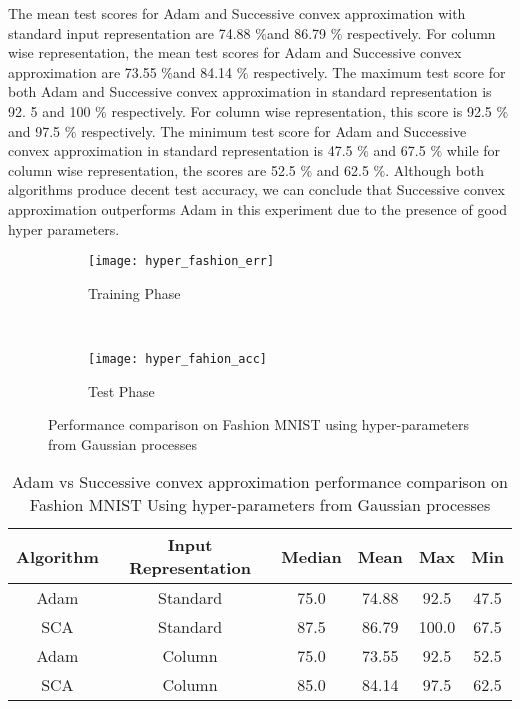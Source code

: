 The mean test scores for Adam and Successive convex approximation with standard input representation are 74.88 $\%$and 86.79 $\%$ respectively. For column wise representation, the mean test scores for Adam and Successive convex approximation are 73.55 $\%$and 84.14 $\%$ respectively. The maximum test score for both Adam and Successive convex approximation in standard representation is 92. 5 and 100 $\%$ respectively. For column wise representation, this score is 92.5 $\%$ and 97.5 $\%$ respectively. The minimum test score for Adam and Successive convex approximation in standard representation is 47.5 $\%$ and 67.5 $\%$ while for column wise representation, the scores are 52.5 $\%$ and 62.5 $\%$. Although both algorithms produce decent test accuracy, we can conclude that Successive convex approximation outperforms Adam in this experiment due to the presence of good hyper parameters.


\begin{figure*}[t!]
    \centering
    \begin{subfigure}[t]{0.5\textwidth}
        \centering
        \texttt{[image: hyper\_fashion\_err]}
        \caption{Training Phase}
    \end{subfigure}%
    ~ 
    \begin{subfigure}[t]{0.5\textwidth}
        \centering
        \texttt{[image: hyper\_fahion\_acc]}
        \caption{Test Phase}
    \end{subfigure}
    \caption{Performance comparison on Fashion MNIST using hyper-parameters from Gaussian processes}
\end{figure*}

\begin{table}
\begin{center}
 \begin{tabular}{||c|| c ||c|| c|| c|| c||} 
 \hline
 Algorithm & Input Representation & Median & Mean & Max & Min \\ [0.5ex] 
 \hline\hline
 Adam & Standard & 75.0 & 74.88 & 92.5 & 47.5 \\ 
 \hline
 SCA & Standard & 87.5 & 86.79 & 100.0 & 67.5 \\
 \hline
 Adam & Column & 75.0 & 73.55 & 92.5 & 52.5\\
 \hline
 SCA & Column & 85.0 & 84.14 & 97.5 & 62.5  \\
 \hline
\end{tabular}
\end{center}
\caption{Adam vs Successive convex approximation performance comparison on Fashion MNIST Using hyper-parameters from Gaussian processes}
\end{table}

